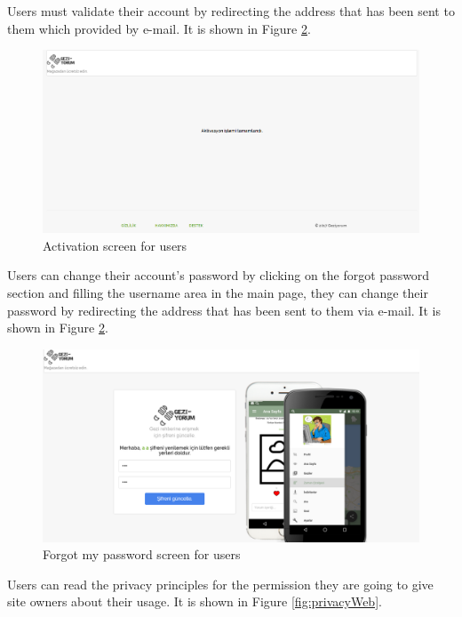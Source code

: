 Users must validate their account by redirecting the address that has been sent to them which provided by e-mail. It is shown in Figure  \ref{fig:registerWeb}. 

\begin{figure}[!htbp]
\centering
\includegraphics[width=\textwidth]{projectChapters/images/activasion.png}
\caption{Activation screen for users}
\label{fig:registerWeb}
\end{figure}

\newpage

Users can change their account's password by clicking on the forgot password section and filling the username area in the main page, they can change their password by redirecting the address that has been sent to them via e-mail. It is shown in Figure  \ref{fig:registerWeb}. 

\begin{figure}[!htbp]
\centering
\includegraphics[width=\textwidth]{projectChapters/images/forgetpass.png}
\caption{Forgot my password screen for users}
\label{fig:registerWeb}
\end{figure}

Users can read the privacy principles for the permission they are going to give site owners about their usage. It is shown in Figure  \ref{fig:privacyWeb}. 

